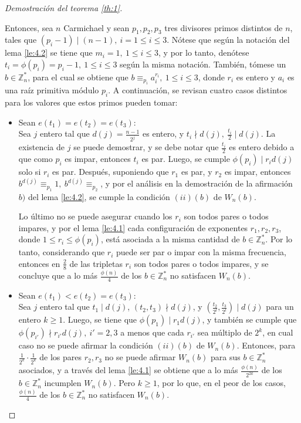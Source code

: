 \documentclass[hidelinks, 12pt]{article}
\newcommand{\Zs}{\mathbb{Z}^*}
\begin{document}
\begin{proof}[Demostración del teorema \ref{th:1}]
\begin{itemize}
\begin{enumerate}
            Entonces, sea $n$ Carmichael y sean $p_1,p_2,p_3$ tres divisores primos distintos de $n$, tales que $(p_i-1)\mid(n-1),~i=1\leq i\leq3$. Nótese que según la notación del lema \ref{le:4.2} se tiene que $m_i=1,~1\leq i\leq 3$, y por lo tanto, denótese $t_i=\phi(p_i)=p_i-1,~1\leq i\leq 3$ según la misma notación. También, tómese un $b\in\Zs_n$, para el cual se obtiene que $b\equiv_{p_i}a_i^{r_i},~1\leq i\leq 3$, donde $r_i$ es entero y $a_i$ es una raíz primitiva módulo $p_i$. A continuación, se revisan cuatro casos distintos para los valores que estos primos pueden tomar:
            \newpage
            \begin{itemize}
                \item Sean $e(t_1)=e(t_2)=e(t_3)$: \\
                Sea $j$ entero tal que $d(j)=\frac{n-1}{2^j}$ es entero, y $t_i\nmid d(j),~\frac{t_i}{2}\mid d(j)$. La existencia de $j$ se puede demostrar, y se debe notar que $\frac{t_i}{2}$ es entero debido a que como $p_i$ es impar, entonces $t_i$ es par. Luego, se cumple $\phi(p_i)\mid r_id(j)$ solo si $r_i$ es par. Después, suponiendo que $r_1$ es par, y $r_2$ es impar, entonces $b^{d(j)}\equiv_{p_1}1,~b^{d(j)}\equiv_{p_2}$, y por el análisis en la demostración de la afirmación $b)$ del lema \ref{le:4.2}, se cumple la condición $(ii)(b)$ de $W_n(b)$. 
                
                Lo último no se puede asegurar cuando los $r_i$ son todos pares o todos impares, y por el lema \ref{le:4.1} cada configuración de exponentes $r_1,r_2,r_3$, donde $1\leq r_i\leq\phi(p_i)$, está asociada a la misma cantidad de $b\in\Zs_n$. Por lo tanto, considerando que $r_i$ puede ser par o impar con la misma frecuencia, entonces en $\frac{2}{8}$ de las tripletas $r_i$ son todos pares o todos impares, y se concluye que a lo más $\frac{\phi(n)}{4}$ de los $b\in\Zs_n$ no satisfacen $W_n(b)$.

                \item Sean $e(t_1)<e(t_2)=e(t_3)$: \\
                Sea $j$ entero tal que $t_1\mid d(j)$, $(t_2,t_3)\nmid d(j)$, y $(\frac{t_2}{2^l},\frac{t_3}{2^l})\mid d(j)$ para un entero $k\geq 1$. Luego, se tiene que $\phi(p_1)\mid r_1d(j)$, y también se cumple que $\phi(p_{i'})\nmid r_{i'}d(j),~i'=2,3$ a menos que cada $r_{i'}$ sea múltiplo de $2^k$, en cual caso no se puede afirmar la condición $(ii)(b)$ de $W_n(b)$. Entonces, para $\frac{1}{2^k}\cdot\frac{1}{2^k}$ de los pares $r_2,r_3$ no se puede afirmar $W_n(b)$ para sus $b\in\Zs_n$ asociados, y a través del lema \ref{le:4.1} se obtiene que a lo más $\frac{\phi(n)}{2^{2k}}$ de los $b\in\Zs_n$ incumplen $W_n(b)$. Pero $k\geq 1$, por lo que, en el peor de los casos, $\frac{\phi(n)}{4}$ de los $b\in\Zs_n$ no satisfacen $W_n(b)$.


\end{itemize}
\end{enumerate}
\end{itemize}
\end{proof}
\end{document}
